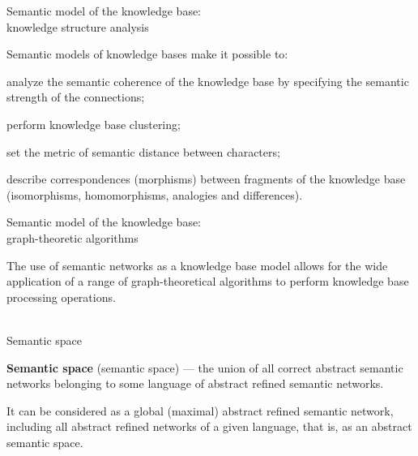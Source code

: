 \begin{frame}{Semantic model of the knowledge base:\\knowledge structure analysis}
	\topline
	\justifying
	
	Semantic models of knowledge bases make it possible to:
	\begin{textitemize}
		\item analyze the semantic coherence of the knowledge base by specifying the semantic strength of the connections;
		\item perform knowledge base clustering;
		\item set the metric of semantic distance between characters;
		\item describe correspondences (morphisms) between fragments of the knowledge base (isomorphisms, homomorphisms, analogies and differences).
	\end{textitemize}
	
\end{frame}


\begin{frame}{Semantic model of the knowledge base:\\graph-theoretic algorithms}
	\topline
	\justifying
	
	The use of semantic networks as a knowledge base model allows for the wide application of a range of graph-theoretical algorithms to perform knowledge base processing operations.
	
\end{frame}


\begin{frame}{\\Semantic space}
	\topline
	\justifying
	
	\textbf{Semantic space} (semantic space) ---
	the union of all correct abstract semantic networks belonging to some language of abstract refined semantic networks.
	
	\medskip
	It can be considered as a global (maximal) abstract refined semantic network, including all abstract refined networks of a given language, that is, as an abstract semantic space.
	
\end{frame}